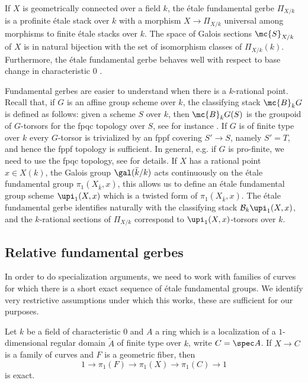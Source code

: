 If $X$ is geometrically connected over a field $k$, the étale fundamental gerbe $\Pi_{X/k}$ is a profinite étale stack over $k$ with a morphism $X\to\Pi_{X/k}$ universal among morphisms to finite étale stacks over $k$. The space of Galois sections $\mc{S}_{X/k}$ of $X$ is in natural bijection with the set of isomorphism classes of $\Pi_{X/k}(k)$. Furthermore, the étale fundamental gerbe behaves well with respect to base change in characteristic $0$ \cite[Proposition A.18]{anab}.

Fundamental gerbes are easier to understand when there is a $k$-rational point. Recall that, if $G$ is an affine group scheme over $k$, the classifying stack $\mc{B}_{k}G$ is defined as follows: given a scheme $S$ over $k$, then $\mc{B}_{k}G(S)$ is the groupoid of $G$-torsors for the fpqc topology over $S$, see for instance \cite[Definition 8.1.14]{olsson}. If $G$ is of finite type over $k$ every $G$-torsor is trivialized by an fppf covering $S'\to S$, namely $S'=T$, and hence the fppf topology is sufficient. In general, e.g. if $G$ is pro-finite, we need to use the fpqc topology, see \cite{bv15} for details. If $X$ has a rational point $x\in X(k)$, the Galois group $\gal(\bar{k}/k)$ acts continuously on the étale fundamental group $\pi_{1}(X_{\bar{k}},x)$, this allows us to define an étale fundamental group scheme $\upi_{1}(X,x)$ which is a twisted form of $\pi_{1}(X_{\bar{k}},x)$. The étale fundamental gerbe identifies naturally with the classifying stack $\mathcal{B}_{k}\upi_{1}(X,x)$, and the $k$-rational sections of $\Pi_{X/k}$ correspond to $\upi_{1}(X,x)$-torsors over $k$.

\subsection{Relative fundamental gerbes}

In order to do specialization arguments, we need to work with families of curves for which there is a short exact sequence of étale fundamental groups. We identify very restrictive assumptions under which this works, these are sufficient for our purposes.


\begin{lemma}
\notready\label{families}
	Let $k$ be a field of characteristic $0$ and $A$ a ring which is a localization of a $1$-dimensional regular domain $\tilde{A}$ of finite type over $k$, write $C=\spec A$. If $X\to C$ is a family of curves and $F$ is a geometric fiber, then
	\[1\to\pi_{1}(F)\to\pi_{1}(X)\to\pi_{1}(C)\to 1\]
	is exact.
\end{lemma}

